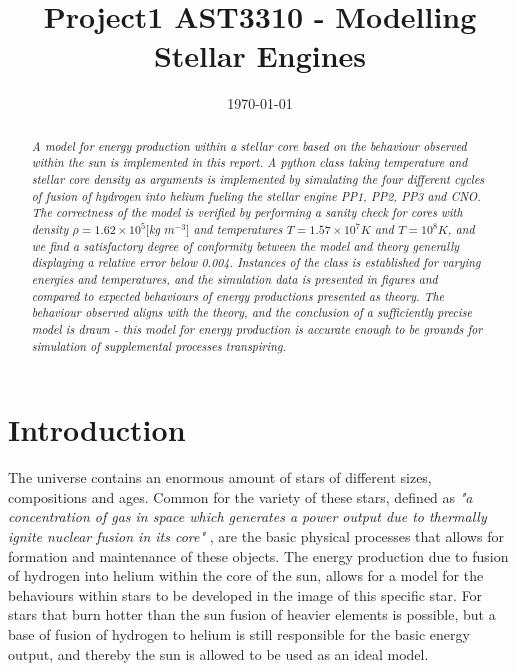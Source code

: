 \documentclass[10pt, nofootinbib, twocolumn]{revtex4-1}
\begin{document}
\vspace*{2\baselineskip}
\title{Project1 AST3310 - Modelling Stellar Engines} 
\vspace*{3\baselineskip}
\date{\today}        
\begin{abstract}
\vspace*{1\baselineskip}
\textit{A model for energy production within a stellar core based on the behaviour observed within the sun is implemented in this report. A python class taking temperature and stellar core density as arguments is implemented by simulating the four different cycles of fusion of hydrogen into helium fueling the stellar engine PP1, PP2, PP3 and CNO. The correctness of the model is verified by performing a sanity check for cores with density $\rho=1.62\times 10^5 [$kg $m^{-3}]$ and temperatures $T= 1.57\times 10^7 K$ and $T= 10^8 K$, and we find a satisfactory degree of conformity between the model and theory generally displaying a relative error below 0.004. Instances of the class is established for varying energies and temperatures, and the simulation data is presented in figures and compared to expected behaviours of energy productions presented as theory. The behaviour observed aligns with the theory, and the conclusion of a sufficiently precise model is drawn - this model for energy production is accurate enough to be grounds for simulation of supplemental processes transpiring.}
\end{abstract}
\maketitle       

\section{Introduction}\label{sec:introduction}
The universe contains an enormous amount of stars of different sizes, compositions and ages. Common for the variety of these stars, defined as \textit{"a concentration of gas in space which generates a power output due to thermally ignite nuclear fusion in its core"} \cite{ast}, are the basic physical processes that allows for formation and maintenance of these objects. The energy production due to fusion of hydrogen into helium within the core of the sun, allows for a model for the behaviours within stars to be developed in the image of this specific star. For stars that burn hotter than the sun fusion of heavier elements is possible, but a base of fusion of hydrogen to helium is still responsible for the basic energy output, and thereby the sun is allowed to be used as an ideal model. \\
\end{document}
